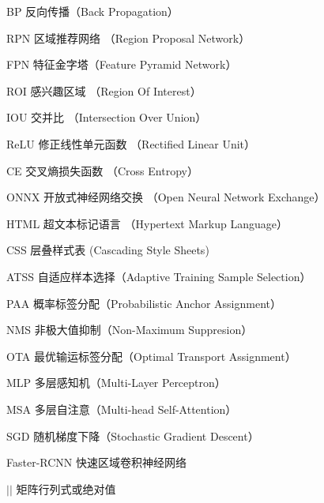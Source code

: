 
\begin{denotation}[3cm]
  \item[BP] 反向传播（Back Propagation）
  \item[RPN] 区域推荐网络 （Region Proposal Network）
  \item[FPN] 特征金字塔（Feature Pyramid Network）
  \item[ROI] 感兴趣区域 （Region Of Interest）
  \item[IOU] 交并比 （Intersection Over Union）
  \item[ReLU] 修正线性单元函数 （Rectified Linear Unit）
  \item[CE] 交叉熵损失函数 （Cross Entropy）
  \item[ONNX] 开放式神经网络交换 （Open Neural Network Exchange）
  \item[HTML] 超文本标记语言 （Hypertext Markup Language）
  \item[CSS] 层叠样式表 (Cascading Style Sheets)
  \item[ATSS] 自适应样本选择（Adaptive Training Sample Selection）
  \item[PAA] 概率标签分配（Probabilistic Anchor Assignment）
  \item[NMS] 非极大值抑制（Non-Maximum Suppresion）
  \item[OTA] 最优输运标签分配（Optimal Transport Assignment）
  \item[MLP] 多层感知机（Multi-Layer Perceptron）
  \item[MSA] 多层自注意（Multi-head Self-Attention）
  \item[SGD] 随机梯度下降（Stochastic Gradient Descent）
  \item[Faster-RCNN] 快速区域卷积神经网络
  \item[$\left| {} \right|$] 矩阵行列式或绝对值
\end{denotation}



